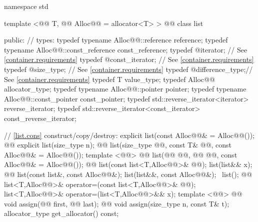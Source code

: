 \documentclass[american,twoside]{book}
\begin{document}
\begin{codeblock}
namespace std {
  template <@@ T, @@ Alloc@@ = allocator<T> >
  @@
  class list {
  public:
    // types:
    typedef typename Alloc@@::reference         reference;
    typedef typename Alloc@@::const_reference   const_reference;
    typedef @\impdef@                iterator;       // See \ref{container.requirements}
    typedef @\impdef@                const_iterator; // See \ref{container.requirements}
    typedef @\impdef@                size_type;      // See \ref{container.requirements}
    typedef @\impdef@                difference_type;// See \ref{container.requirements}
    typedef T                                     value_type;
    typedef Alloc@@                             allocator_type;
    typedef typename Alloc@@::pointer           pointer;
    typedef typename Alloc@@::const_pointer     const_pointer;
    typedef std::reverse_iterator<iterator>       reverse_iterator;
    typedef std::reverse_iterator<const_iterator> const_reverse_iterator;

    // \ref{list.cons} construct/copy/destroy:
    explicit list(const Alloc@@& = Alloc@@());
    @@ explicit list(size_type n);
    @@ 
      list(size_type @@, const T& @@, const Alloc@@& = Alloc@@());
    template <@@>
      @@
      list(@@ @@, @@ @@, const Alloc@@& = Alloc@@());
    @@ list(const list<T,Alloc@@>& @@);
    list(list&& x);
    @@ list(const list&, const Alloc@@&);
    list(list&&, const Alloc@@&);
   ~list();
    @@ 
      list<T,Alloc@@>& operator=(const list<T,Alloc@@>& @@);
    list<T,Alloc@@>& operator=(list<T,Alloc@@>&& x);
    template <@@>
      @@
      void assign(@@ first, @@ last);
    @@ 
      void assign(size_type n, const T& t);
    allocator_type get_allocator() const;

}}
\end{codeblock}
\end{document}
